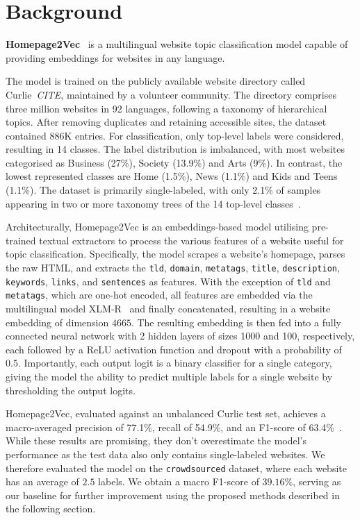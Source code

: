 \section{Background}
\label{sec:background}

\textbf{Homepage2Vec}~\cite{homepage2vec} is a multilingual website topic classification model capable of providing embeddings for websites in any language. 

The model is trained on the publicly available website directory called Curlie~\textit{CITE}, maintained by a volunteer community. The directory comprises three million websites in 92 languages, following a taxonomy of hierarchical topics. After removing duplicates and retaining accessible sites, the dataset contained 886K entries. For classification, only top-level labels were considered, resulting in 14 classes. The label distribution is imbalanced, with most websites categorised as Business (27\%), Society (13.9\%) and Arts (9\%). In contrast, the lowest represented classes are Home (1.5\%), News (1.1\%) and Kids and Teens (1.1\%). The dataset is primarily single-labeled, with only 2.1\% of samples appearing in two or more taxonomy trees of the 14 top-level classes~\cite{homepage2vec}.

Architecturally, Homepage2Vec is an embeddings-based model utilising pre-trained textual extractors to process the various features of a website useful for topic classification. Specifically, the model scrapes a website's homepage, parses the raw HTML, and extracts the \texttt{tld}, \texttt{domain}, \texttt{metatags}, \texttt{title}, \texttt{description}, \texttt{keywords}, \texttt{links}, and \texttt{sentences} as features. With the exception of \texttt{tld} and \texttt{metatags}, which are one-hot encoded, all features are embedded via the multilingual model XLM-R~\cite{xmlr} and finally concatenated, resulting in a website embedding of dimension $4665$. The resulting embedding is then fed into a fully connected neural network with 2 hidden layers of sizes 1000 and 100, respectively, each followed by a ReLU activation function and dropout with a probability of $0.5$. Importantly, each output logit is a binary classifier for a single category, giving the model the ability to predict multiple labels for a single website by thresholding the output logits. 

Homepage2Vec, evaluated against an unbalanced Curlie test set, achieves a macro-averaged precision of 77.1\%, recall of 54.9\%, and an F1-score of 63.4\%~\cite{homepage2vec}. While these results are promising, they don't overestimate the model's performance as the test data also only contains single-labeled websites. We therefore evaluated the model on the \texttt{crowdsourced} dataset, where each website has an average of $2.5$ labels. We obtain a macro F1-score of $39.16\%$, serving as our baseline for further improvement using the proposed methods described in the following section.


